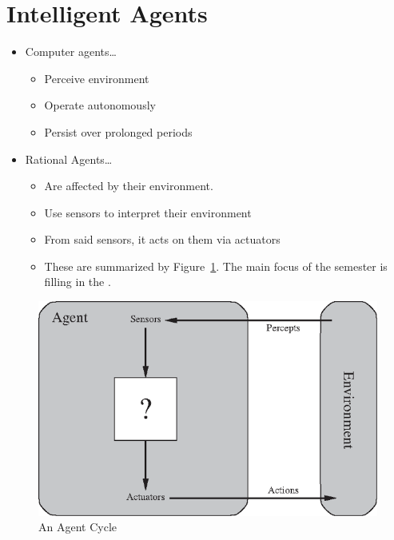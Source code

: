 %
%
%

\section{Intelligent Agents}
\begin{itemize}
    \item Computer agents\ldots
        \begin{itemize}
            \item Perceive environment
            \item Operate autonomously
            \item Persist over prolonged periods
        \end{itemize}

    \item Rational Agents\ldots
        \begin{itemize}
            \item Are affected by their environment.
            \item Use sensors to interpret their environment
            \item From said sensors, it acts on them via actuators
            \item These are summarized by Figure~\ref{fig:diagram}. The main focus of the semester is filling in the .
        \end{itemize}
\end{itemize}

\begin{figure}[htpb]
    \centering
    \includegraphics[width=.5\linewidth]{./assets/agent-diagram.png}
    \caption{An Agent Cycle}\label{fig:diagram}
\end{figure}

